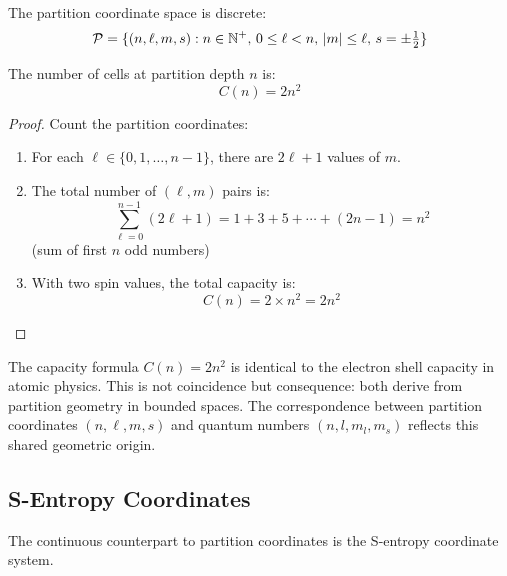 The partition coordinate space is discrete:
\begin{equation}
\mathcal{P} = \{(n, \ell, m, s) : n \in \mathbb{N}^+, \, 0 \leq \ell < n, \, |m| \leq \ell, \, s = \pm\tfrac{1}{2}\}
\end{equation}

\begin{theorem}
\label{thm:capacity}
The number of cells at partition depth $n$ is:
\begin{equation}
C(n) = 2n^2
\label{eq:capacity}
\end{equation}
\end{theorem}

\begin{proof}
Count the partition coordinates:
\begin{enumerate}
    \item For each $\ell \in \{0, 1, \ldots, n-1\}$, there are $2\ell + 1$ values of $m$.
    \item The total number of $(\ell, m)$ pairs is:
    \begin{equation}
    \sum_{\ell=0}^{n-1} (2\ell + 1) = 1 + 3 + 5 + \cdots + (2n-1) = n^2
    \end{equation}
    (sum of first $n$ odd numbers)
    \item With two spin values, the total capacity is:
    \begin{equation}
    C(n) = 2 \times n^2 = 2n^2
    \end{equation}
\end{enumerate}
\end{proof}

\begin{remark}
The capacity formula $C(n) = 2n^2$ is identical to the electron shell capacity in atomic physics. This is not coincidence but consequence: both derive from partition geometry in bounded spaces. The correspondence between partition coordinates $(n, \ell, m, s)$ and quantum numbers $(n, l, m_l, m_s)$ reflects this shared geometric origin.
\end{remark}

\subsection{S-Entropy Coordinates}

The continuous counterpart to partition coordinates is the S-entropy coordinate system.

